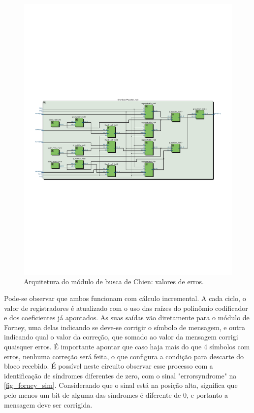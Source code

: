 	\begin{figure}[!htb]
		\caption{\label{fig_chienval_arq}Arquitetura do módulo de busca de Chien: valores de erros.}
		\centering
		\includegraphics[width=1\textwidth]{RS/ChienValueRTL.pdf}
		\legend{}
	\end{figure}
	
	Pode-se observar que ambos funcionam com cálculo incremental. A cada ciclo, o valor de registradores é atualizado com o uso das raízes do polinômio codificador e dos coeficientes já apontados. As suas saídas vão diretamente para o módulo de Forney, uma delas indicando se deve-se corrigir o símbolo de mensagem, e outra indicando qual o valor da correção, que somado ao valor da mensagem corrigi quaisquer erros. É importante apontar que caso haja mais do que 4 símbolos com erros, nenhuma correção será feita, o que configura a condição para descarte do bloco recebido. É possível neste circuito observar esse processo com a identificação de síndromes diferentes de zero, com o sinal "errorsyndrome" na \autoref{fig_forney_sim}. Considerando que o sinal está na posição alta, significa que pelo menos um bit de alguma das síndromes é diferente de 0, e portanto a mensagem deve ser corrigida. 
	
